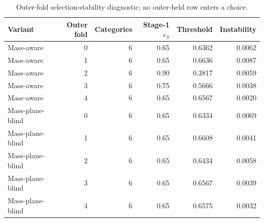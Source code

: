 \begin{table}[tb]
  \centering
  \footnotesize
  \caption{Outer-fold selection-stability diagnostic; no outer-held row enters a choice.}
  \label{tab:c7w-stability}
  \begin{tabular}{lrrrrr}
    \toprule
    Variant & Outer fold & Categories & Stage-1 $\epsilon_S$ & Threshold & Instability \\
    \midrule
    Mass-aware & 0 & 6 & 0.65 & 0.6362 & 0.0062 \\
    Mass-aware & 1 & 6 & 0.65 & 0.6636 & 0.0087 \\
    Mass-aware & 2 & 6 & 0.90 & 0.3817 & 0.0059 \\
    Mass-aware & 3 & 6 & 0.75 & 0.5666 & 0.0038 \\
    Mass-aware & 4 & 6 & 0.65 & 0.6567 & 0.0020 \\
    Mass-plane-blind & 0 & 6 & 0.65 & 0.6334 & 0.0069 \\
    Mass-plane-blind & 1 & 6 & 0.65 & 0.6608 & 0.0041 \\
    Mass-plane-blind & 2 & 6 & 0.65 & 0.6434 & 0.0058 \\
    Mass-plane-blind & 3 & 6 & 0.65 & 0.6567 & 0.0039 \\
    Mass-plane-blind & 4 & 6 & 0.65 & 0.6575 & 0.0032 \\
    \bottomrule
  \end{tabular}
\end{table}
